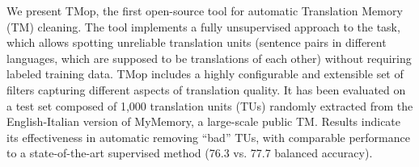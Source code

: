 We present TMop, the first open-source tool for automatic Translation Memory (TM) cleaning. The tool implements a fully unsupervised approach to the task, which allows spotting unreliable translation units (sentence pairs in different languages, which are supposed to be translations of each other) without requiring labeled training data. TMop includes a highly configurable and extensible set of filters capturing different aspects of translation quality. It has been evaluated on a test set composed of 1,000 translation units (TUs) randomly extracted from the English-Italian version of MyMemory, a large-scale public TM. Results indicate its effectiveness in automatic removing ``bad'' TUs, with comparable performance to a state-of-the-art supervised method (76.3 vs. 77.7 balanced accuracy).
